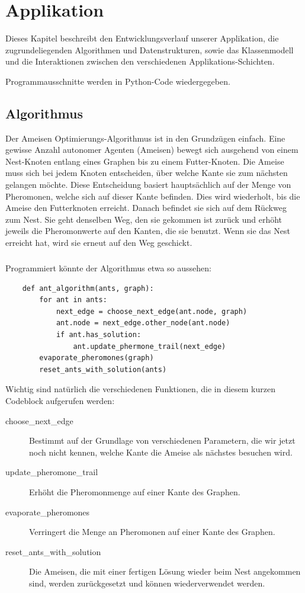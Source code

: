 
\chapter{Applikation}

Dieses Kapitel beschreibt den Entwicklungsverlauf unserer Applikation, die zugrundeliegenden Algorithmen und Datenstrukturen, sowie das Klassenmodell und die Interaktionen zwischen den verschiedenen Applikations-Schichten.

Programmausschnitte werden  in Python-Code wiedergegeben.

\section{Algorithmus}
\label{sec:algorithm}

Der Ameisen Optimierungs-Algorithmus ist in den Grundzügen einfach. Eine gewisse Anzahl autonomer Agenten (Ameisen) bewegt sich ausgehend von einem Nest-Knoten entlang eines Graphen bis zu einem Futter-Knoten. Die Ameise muss sich bei jedem Knoten entscheiden, über welche Kante sie zum nächsten gelangen möchte. Diese Entscheidung basiert hauptsächlich auf der Menge von Pheromonen, welche sich auf dieser Kante befinden. Dies wird wiederholt, bis die Ameise den Futterknoten erreicht. Danach befindet sie sich auf dem Rückweg zum Nest. Sie geht denselben Weg, den sie gekommen ist zurück und erhöht jeweils die Pheromonwerte auf den Kanten, die sie benutzt. Wenn sie das Nest erreicht hat, wird sie erneut auf den Weg geschickt.

\paragraph*{}
\noindent
Programmiert könnte der Algorithmus etwa so aussehen:

\begin{lstlisting}
	def ant_algorithm(ants, graph):
		for ant in ants:
			next_edge = choose_next_edge(ant.node, graph)
			ant.node = next_edge.other_node(ant.node)
			if ant.has_solution:
				ant.update_phermone_trail(next_edge)	
		evaporate_pheromones(graph)
		reset_ants_with_solution(ants)
\end{lstlisting}

Wichtig sind natürlich die verschiedenen Funktionen, die in diesem kurzen Codeblock aufgerufen werden:

\begin{description}
\item[choose\_next\_edge] Bestimmt auf der Grundlage von verschiedenen Parametern, die wir jetzt noch nicht kennen, welche Kante die Ameise als nächstes besuchen wird.
\item[update\_pheromone\_trail] Erhöht die Pheromonmenge auf einer Kante des Graphen.
\item[evaporate\_pheromones] Verringert die Menge an Pheromonen auf einer Kante des Graphen.
\item[reset\_ants\_with\_solution] Die Ameisen, die mit einer fertigen Lösung wieder beim Nest angekommen sind, werden zurückgesetzt und können wiederverwendet werden. 
\end{description}

